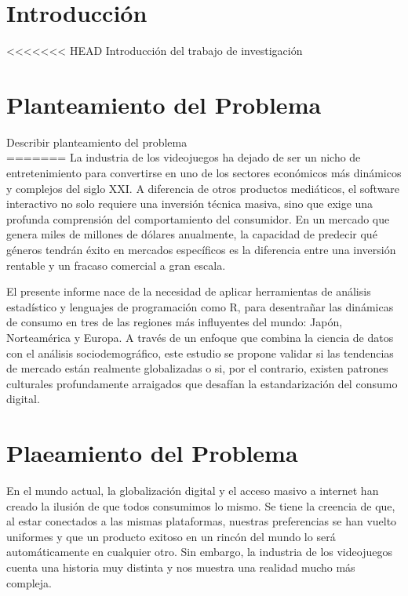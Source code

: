\documentclass[oneside,11pt]{Latex/Classes/PhDthesisPSnPDF}
\begin{document}
  \cleardoublepage

\mainmatter
\def\baselinestretch{1.5}

\chapter*{Introducción}

<<<<<<< HEAD
Introducción del trabajo de investigación

\chapter{Planteamiento del Problema}

Describir planteamiento del problema\\
=======
La industria de los videojuegos ha dejado de ser un nicho de
entretenimiento para convertirse en uno de los sectores económicos más
dinámicos y complejos del siglo XXI. A diferencia de otros productos
mediáticos, el software interactivo no solo requiere una inversión
técnica masiva, sino que exige una profunda comprensión del
comportamiento del consumidor. En un mercado que genera miles de
millones de dólares anualmente, la capacidad de predecir qué géneros
tendrán éxito en mercados específicos es la diferencia entre una
inversión rentable y un fracaso comercial a gran escala.

El presente informe nace de la necesidad de aplicar herramientas de
análisis estadístico y lenguajes de programación como R, para
desentrañar las dinámicas de consumo en tres de las regiones más
influyentes del mundo: Japón, Norteamérica y Europa. A través de un
enfoque que combina la ciencia de datos con el análisis
sociodemográfico, este estudio se propone validar si las tendencias de
mercado están realmente globalizadas o si, por el contrario, existen
patrones culturales profundamente arraigados que desafían la
estandarización del consumo digital.

\chapter{Plaeamiento del Problema}

En el mundo actual, la globalización digital y el acceso masivo a
internet han creado la ilusión de que todos consumimos lo mismo. Se
tiene la creencia de que, al estar conectados a las mismas plataformas,
nuestras preferencias se han vuelto uniformes y que un producto exitoso
en un rincón del mundo lo será automáticamente en cualquier otro. Sin
embargo, la industria de los videojuegos cuenta una historia muy
distinta y nos muestra una realidad mucho más compleja.
\end{document}
